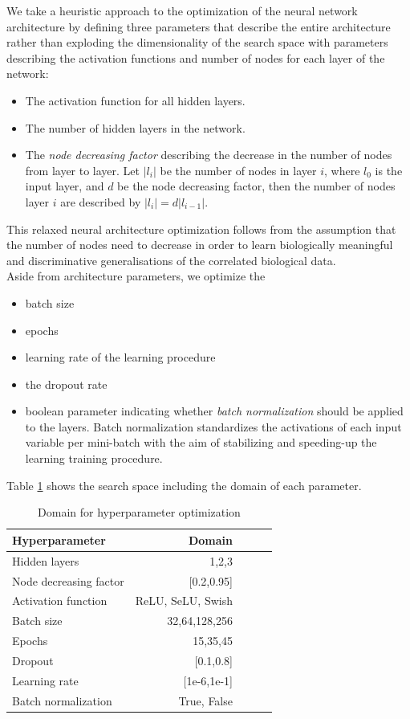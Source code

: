\documentclass[bsc,frontabs,twoside,singlespacing,parskip,deptreport]{infthesis}     %
\begin{document}
We take a heuristic approach to the optimization of the neural network architecture by defining three parameters that describe the entire architecture rather than exploding the dimensionality of the search space with parameters describing the activation functions and number of nodes for each layer of the network:
\begin{itemize}
    \item The activation function for all hidden layers.
    \item The number of hidden layers in the network.
    \item The \textit{node decreasing factor} describing the decrease in the number of nodes from layer to layer. Let \(|l_i|\) be the number of nodes in layer \(i\), where \(l_0\) is the input layer, and \(d\) be the node decreasing factor, then the number of nodes layer \(i\) are described by \( |l_i| = d|l_{i-1}| \).
\end{itemize}
This relaxed neural architecture optimization follows from the assumption that the number of nodes need to decrease in order to learn biologically meaningful and discriminative generalisations of the correlated biological data. \\
Aside from architecture parameters, we optimize the 
\begin{itemize}
    \item batch size
    \item epochs
    \item learning rate of the learning procedure
    \item the dropout rate
    \item boolean parameter indicating whether \textit{batch normalization} should be applied to the layers. Batch normalization standardizes the activations of each input variable per mini-batch with the aim of stabilizing and speeding-up the learning training procedure.\\
\end{itemize}

Table \ref{search_sapce} shows the search space including the domain of each parameter.

\begin{table}[h!]
\centering
\begin{tabular}{lrrrr}
\toprule
{Hyperparameter} &  Domain  \\
\midrule
Hidden layers & {1,2,3} \\
Node decreasing factor & [0.2,0.95] \\
Activation function & {ReLU, SeLU, Swish} \\
Batch size & {32,64,128,256} \\
Epochs & {15,35,45} \\
Dropout & [0.1,0.8] \\
Learning rate & [1e-6,1e-1]  \\
Batch normalization & {True, False} \\
\bottomrule
\end{tabular}
\caption{Domain for hyperparameter optimization}\label{search_sapce}
\end{table}
\end{document}
